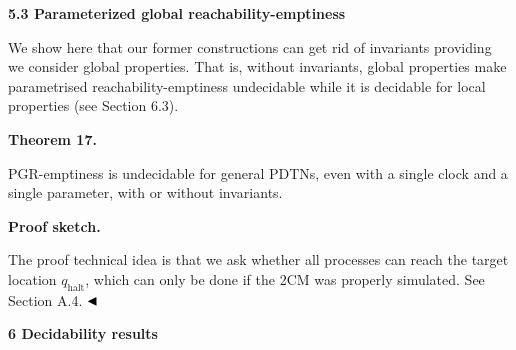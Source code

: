 \documentclass[10pt,a4paper]{article}
\begin{document}
 
 
 
 
\par\medskip\noindent\textbf{5.3 Parameterized global reachability-emptiness}\par
 
 
We show here that our former constructions can get rid of invariants providing we consider global properties. That is, without invariants, global properties make parametrised reachability-emptiness undecidable while it is decidable for local properties (see Section 6.3).\par
 
 

 
\par\medskip\noindent\textbf{Theorem 17.}\par
 
 
PGR-emptiness is undecidable for general PDTNs, even with a single clock and a single parameter, with or without invariants.\par
 
 

 
 
\par\medskip\noindent\textbf{Proof sketch.}\par
 
 
The proof technical idea is that we ask whether all processes can reach the target location $q_{\textrm{halt}}$, which can only be done if the 2CM was properly simulated. See Section A.4. $\hfill\blacktriangleleft$\par
 
 
 
 


 
\par\medskip\noindent\textbf{6 Decidability results}\par
 
\end{document}
